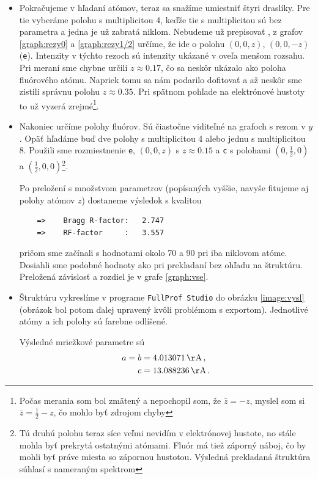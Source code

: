 \documentclass[a4paper, 10pt]{article}
\newcommand{\unit}[1]{\ensuremath{\, \mathrm{#1}}}
\begin{document}
\begin{itemize}
\item Pokračujeme v hľadaní atómov, teraz sa snažíme umiestniť štyri draslíky. Pre tie vyberáme polohu s multiplicitou 4, keďže tie s multiplicitou sú bez parametra a jedna je už zabratá niklom. Nebudeme už prepisovať \cite{tab}, z grafov \ref{graph:rezy0} a \ref{graph:rezy1/2} určíme, že ide o polohu $(0,0,z)$, $(0,0,-z)$ (\texttt{e}). Intenzity v týchto rezoch sú intenzity ukázané v oveľa menšom rozsahu. Pri meraní sme chybne určili $z\approx 0.17$, čo sa neskôr ukázalo ako poloha fluórového atómu. Napriek tomu sa nám podarilo dofitovať a až neskôr sme zistili správnu polohu $z\approx 0.35$. Pri spätnom pohľade na elektrónové hustoty to už vyzerá zrejmé\footnote{Počas merania som bol zmätený a nepochopil som, že $\bar z = -z$, myslel som si $\bar z = \frac 12 -z$, čo mohlo byť zdrojom chyby}.

\item Nakoniec určíme polohy fluórov. Sú čiastočne viditeľné na grafoch s rezom v $y$. Opäť hľadáme buď dve polohy s multiplicitou 4 alebo jednu s multiplicitou 8. Použili sme rozmiestnenie \texttt{e},   $(0,0,z)$ s $z\approx 0.15$ a \texttt{c} s polohami  $(0,\frac 12, 0)$ a  $(\frac 12,0,0)$\footnote{ Tú druhú polohu teraz síce veľmi nevidím v elektrónovej hustote, no stále mohla byť prekrytá ostatnými atómami. Fluór má tiež záporný náboj, čo by mohli byť práve miesta so zápornou hustotou. Výsledná prekladaná štruktúra súhlasí s nameraným spektrom}.

Po preložení s množstvom parametrov (popísaných vyššie, navyše fitujeme aj polohy atómov $z$) dostaneme výsledok s kvalitou
\begin{verbatim}
    =>    Bragg R-factor:   2.747
    =>    RF-factor     :   3.557
\end{verbatim}
pričom sme začínali s hodnotami okolo 70 a 90 pri iba niklovom atóme. Dosiahli sme podobné hodnoty ako pri prekladaní bez ohľadu na štruktúru. Preložená závislosť a rozdiel je  v grafe \ref{graph:vse}. 

\item Štruktúru vykreslíme   v programe \texttt{FullProf Studio} do obrázku \ref{image:vysl} (obrázok bol potom ďalej upravený kvôli problémom s exportom). Jednotlivé atómy a ich polohy sú farebne odlíšené.

Výsledné mriežkové parametre sú 
\begin{align*}
 a =b &= 4.013071\unit\AA  \,, \\
 c &= 13.088236 \unit\AA \,.
\end{align*}
\end{itemize}
\end{document}
